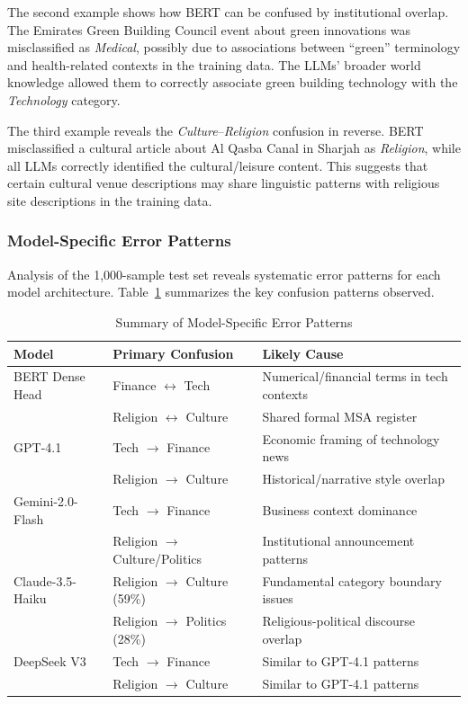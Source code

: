 \documentclass[sn-mathphys-num]{sn-jnl}
\begin{document}
The second example shows how BERT can be confused by institutional overlap. The Emirates Green Building Council event about green innovations was misclassified as \textit{Medical}, possibly due to associations between ``green'' terminology and health-related contexts in the training data. The LLMs' broader world knowledge allowed them to correctly associate green building technology with the \textit{Technology} category.

The third example reveals the \textit{Culture}--\textit{Religion} confusion in reverse. BERT misclassified a cultural article about Al Qasba Canal in Sharjah as \textit{Religion}, while all LLMs correctly identified the cultural/leisure content. This suggests that certain cultural venue descriptions may share linguistic patterns with religious site descriptions in the training data.

\subsubsection{Model-Specific Error Patterns}

Analysis of the 1,000-sample test set reveals systematic error patterns for each model architecture. Table~\ref{tab:error-summary} summarizes the key confusion patterns observed.

\begin{table}[h!]
    \centering
    \caption{Summary of Model-Specific Error Patterns}
    \label{tab:error-summary}
    \small
    \begin{tabular}{lll}
        \toprule
        \textbf{Model} & \textbf{Primary Confusion} & \textbf{Likely Cause} \\
        \midrule
        BERT Dense Head & Finance $\leftrightarrow$ Tech & Numerical/financial terms in tech contexts \\
        & Religion $\leftrightarrow$ Culture & Shared formal MSA register \\
        \addlinespace
        GPT-4.1 & Tech $\rightarrow$ Finance & Economic framing of technology news \\
        & Religion $\rightarrow$ Culture & Historical/narrative style overlap \\
        \addlinespace
        Gemini-2.0-Flash & Tech $\rightarrow$ Finance & Business context dominance \\
        & Religion $\rightarrow$ Culture/Politics & Institutional announcement patterns \\
        \addlinespace
        Claude-3.5-Haiku & Religion $\rightarrow$ Culture (59\%) & Fundamental category boundary issues \\
        & Religion $\rightarrow$ Politics (28\%) & Religious-political discourse overlap \\
        \addlinespace
        DeepSeek V3 & Tech $\rightarrow$ Finance & Similar to GPT-4.1 patterns \\
        & Religion $\rightarrow$ Culture & Similar to GPT-4.1 patterns \\
        \bottomrule
    \end{tabular}
\end{table}
\end{document}
